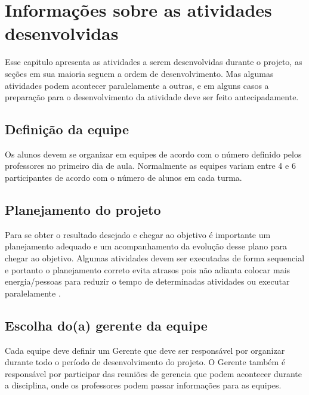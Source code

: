 \chapter{Informações sobre as atividades desenvolvidas}

Esse capitulo apresenta as atividades a serem desenvolvidas durante o projeto, as seções em sua maioria seguem a ordem de desenvolvimento. Mas algumas atividades podem acontecer paralelamente a outras, e em alguns casos a preparação para o desenvolvimento da atividade deve ser feito antecipadamente.

\section{Definição da equipe}\label{atv-definicao-equipe}
Os alunos devem se organizar em equipes de acordo com o número definido pelos professores no primeiro dia de aula. Normalmente as equipes variam entre 4 e 6 participantes de acordo com o número de alunos em cada turma. 






\section{Planejamento do projeto}\label{atv-planejamento-projeto}

Para se obter o resultado desejado e chegar ao objetivo é importante um planejamento adequado e um acompanhamento da evolução desse plano para chegar ao objetivo. Algumas  atividades devem ser executadas de forma sequencial e portanto o planejamento correto evita atrasos pois não adianta colocar mais energia/pessoas para reduzir o tempo de determinadas atividades ou executar paralelamente \cite{brooks1995mythical}.



\section{Escolha do(a) gerente da equipe}\label{atv-escolha-gerente}
Cada equipe deve definir um Gerente que deve ser responsável por organizar durante todo o período de desenvolvimento do projeto. O Gerente também é responsável por participar das reuniões de gerencia que podem acontecer durante a disciplina, onde os professores podem passar informações para as equipes.


